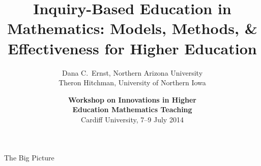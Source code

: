 \documentclass[10pt,handout]{beamer}
\begin{document}

\title[Inquiry-Based Education in Mathematics]
{\large \textbf{Inquiry-Based Education in Mathematics: Models, Methods, \& Effectiveness for Higher Education}}
\author[D.C.~Ernst and TJ Hitchman]{Dana C.~Ernst, Northern Arizona University\\
Theron Hitchman, University of Northern Iowa}

\vspace{1em}

\date{\textbf{Workshop on Innovations in Higher\\ Education Mathematics Teaching}\\
Cardiff University, 7--9 July 2014}

\frame{\titlepage}


\begin{frame}

\vfill
\begin{center}
\end{center}
\vfill

\end{frame}


\begin{frame}

\begin{block}{The Big Picture}

\vspace{1em}

\end{block}

\end{frame}

\end{document}

